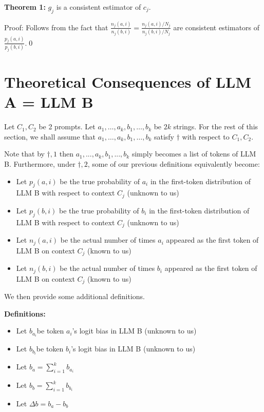 \documentclass{article}
\begin{document}
\textbf{Theorem 1:} $\displaystyle g_{j}$ is a consistent estimator of $\displaystyle c_{j}$.



Proof: Follows from the fact that $\displaystyle \frac{n_{j}( a,i)}{n_{j}( b,i)} =\frac{n_{j}( a,i) /N_{j}}{n_{j}( b,i) /N_{j}}$ are consistent estimators of $\displaystyle \frac{p_{j}( a,i)}{p_{j}( b,i)}$.\qed 





\section{Theoretical Consequences of LLM A = LLM B}
\begin{mdframed}
Let $C_1, C_2$ be 2 prompts. Let $a_1,\ldots,a_k,b_1,\ldots,b_k$ be $2k$ strings.
For the rest of this section, we shall assume that
$a_1,\ldots,a_k,b_1,\ldots,b_k$ satisfy $\dagger$ with respect to $C_1, C_2$.
\end{mdframed}


Note that by $\displaystyle \dagger ,1$ then $\displaystyle a_{1} ,...,a_{k} ,b_{1} ,...,b_{k}$ simply becomes a list of tokens of LLM B. Furthermore, under $\displaystyle \dagger ,2$, some of our previous definitions equivalently become:
\begin{itemize}
\item Let $\displaystyle p_{j}( a,i)$ be the true probability of $\displaystyle a_{i}$ in the first-token distribution of LLM B with respect to context $\displaystyle C_{j}$ (unknown to us)
\item Let $\displaystyle p_{j}( b,i)$ be the true probability of $\displaystyle b_{i}$ in the first-token distribution of LLM B with respect to context $\displaystyle C_{j}$ (unknown to us)
\item Let $\displaystyle n_{j}( a,i)$ be the actual number of times $\displaystyle a_{i}$ appeared as the first token of LLM B on context $\displaystyle C_{j}$ (known to us)
\item Let $\displaystyle n_{j}( b,i)$ be the actual number of times $\displaystyle b_{i}$ appeared as the first token of LLM B on context $\displaystyle C_{j}$ (known to us)
\end{itemize}



We then provide some additional definitions.

\textbf{Definitions:}
\begin{itemize}
\item Let $\displaystyle b_{a_{i}}$be token $\displaystyle a_{i}$'s logit bias in LLM B (unknown to us)
\item Let $\displaystyle b_{b_{i}}$be token $\displaystyle b_{i}$'s logit bias in LLM B (unknown to us)
\item Let $\displaystyle b_{a} =\sum _{i=1}^{k} b_{a_{i}}$
\item Let $\displaystyle b_{b} =\sum _{i=1}^{k} b_{b_{i}}$
\item Let $\displaystyle \Delta b=b_{a} -b_{b}$
\end{itemize}
\end{document}
